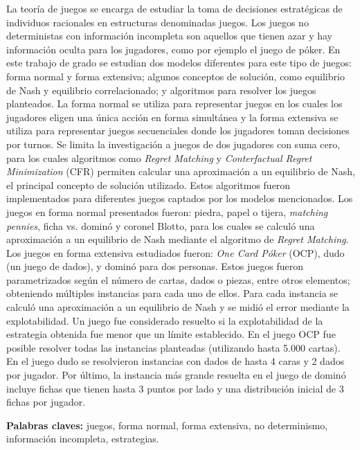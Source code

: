 \begin{resumen}
    La teoría de juegos se encarga de estudiar la toma de decisiones estratégicas de individuos racionales en estructuras denominadas juegos. Los juegos no deterministas con información incompleta son aquellos que tienen azar y hay información oculta para los jugadores, como por ejemplo el juego de póker. En este trabajo de grado se estudian dos modelos diferentes para este tipo de juegos: forma normal y forma extensiva; algunos conceptos de solución, como equilibrio de Nash y equilibrio correlacionado; y algoritmos para resolver los juegos planteados. La forma normal se utiliza para representar juegos en los cuales los jugadores eligen una única acción en forma simultánea y la forma extensiva se utiliza para representar juegos secuenciales donde los jugadores toman decisiones por turnos. Se limita la investigación a juegos de dos jugadores con suma cero, para los cuales algoritmos como \textit{Regret Matching} y \textit{Conterfactual Regret Minimization} (CFR) permiten calcular una aproximación a un equilibrio de Nash, el principal concepto de solución utilizado. Estos algoritmos fueron implementados para diferentes juegos captados por los modelos mencionados. Los juegos en forma normal presentados fueron: piedra, papel o tijera, \textit{matching pennies}, ficha vs. dominó y coronel Blotto, para los cuales se calculó una aproximación a un equilibrio de Nash mediante el algoritmo de \textit{Regret Matching}. Los juegos en forma extensiva estudiados fueron: \textit{One Card Póker} (OCP), dudo (un juego de dados), y dominó para dos personas. Estos juegos fueron parametrizados según el número de cartas, dados o piezas, entre otros elementos; obteniendo múltiples instancias para cada uno de ellos. Para cada instancia se calculó una aproximación a un equilibrio de Nash y se midió el error mediante la explotabilidad. Un juego fue considerado resuelto si la explotabilidad de la estrategia obtenida fue menor que un límite establecido. En el juego OCP fue posible resolver todas las instancias planteadas (utilizando hasta 5.000 cartas). En el juego dudo se resolvieron instancias con dados de hasta 4 caras y 2 dados por jugador. Por último, la instancia más grande resuelta en el juego de dominó incluye fichas que tienen hasta 3 puntos por lado y una distribución inicial de 3 fichas por jugador.
    
    \vfill
    \textbf{Palabras claves:} juegos, forma normal, forma extensiva, no determinismo, información incompleta, estrategias.
\end{resumen}